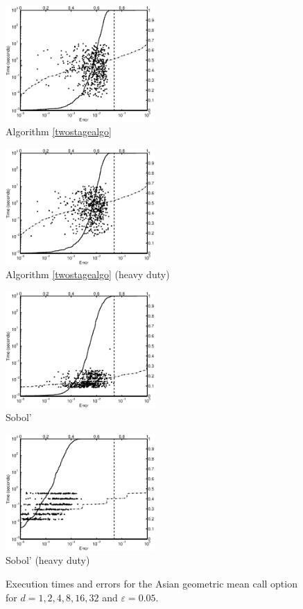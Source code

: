 \documentclass[graybox]{svmult}
\begin{document}
\begin{figure}
\centering
\begin{minipage}{5.7cm} \centering \includegraphics[width=5.7cm]{geomeaniidErrTime.eps} \\ Algorithm \ref{twostagealgo} \end{minipage}
\begin{minipage}{5.7cm} \centering \includegraphics[width=5.7cm]{geomeaniidheavyErrTime.eps} \\ Algorithm \ref{twostagealgo} (heavy duty)\end{minipage}
\begin{minipage}{5.7cm} \centering \includegraphics[width=5.7cm]{geomeanSobolErrTime.eps} \\ Sobol' \end{minipage}
\begin{minipage}{5.7cm} \centering \includegraphics[width=5.7cm]{geomeanSobolheavyErrTime.eps} \\ Sobol' (heavy duty) \end{minipage}
\caption{Execution times and errors for the Asian geometric mean call option for $d=1, 2, 4, 8, 16, 32$ and $\varepsilon=0.05$.\label{AsianGeoMeanCallFig}}
\end{figure}
\end{document}
